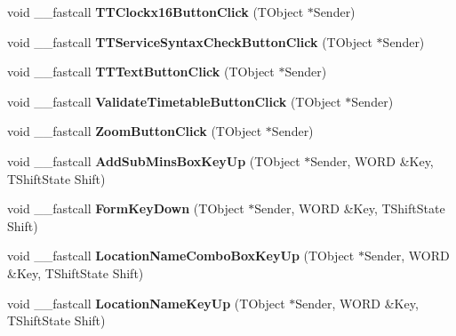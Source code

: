 \begin{DoxyCompactItemize}
\mbox{\label{class_t_interface_a4d15b0fdf4e9377ed3b528787d466be4}} 
void \+\_\+\+\_\+fastcall {\bfseries T\+T\+Clockx16\+Button\+Click} (T\+Object $\ast$Sender)
\item 
\mbox{\label{class_t_interface_a003b10236c2b4316dc57be370c715c44}} 
void \+\_\+\+\_\+fastcall {\bfseries T\+T\+Service\+Syntax\+Check\+Button\+Click} (T\+Object $\ast$Sender)
\item 
\mbox{\label{class_t_interface_a37d4b92bd992fcaee2465a0f04becbee}} 
void \+\_\+\+\_\+fastcall {\bfseries T\+T\+Text\+Button\+Click} (T\+Object $\ast$Sender)
\item 
\mbox{\label{class_t_interface_a2f501868bbee2310af99bf2e8e265c59}} 
void \+\_\+\+\_\+fastcall {\bfseries Validate\+Timetable\+Button\+Click} (T\+Object $\ast$Sender)
\item 
\mbox{\label{class_t_interface_a08305797df7dfbdd16b3e8900c33e0bc}} 
void \+\_\+\+\_\+fastcall {\bfseries Zoom\+Button\+Click} (T\+Object $\ast$Sender)
\item 
\mbox{\label{class_t_interface_a0abab134f4994b02507e1e2d3f31cd77}} 
void \+\_\+\+\_\+fastcall {\bfseries Add\+Sub\+Mins\+Box\+Key\+Up} (T\+Object $\ast$Sender, W\+O\+RD \&Key, T\+Shift\+State Shift)
\item 
\mbox{\label{class_t_interface_acc63cfe8eb8e41508e32c7f7681e7e03}} 
void \+\_\+\+\_\+fastcall {\bfseries Form\+Key\+Down} (T\+Object $\ast$Sender, W\+O\+RD \&Key, T\+Shift\+State Shift)
\item 
\mbox{\label{class_t_interface_a212c7d3a2260f69a675c7053a31cad4b}} 
void \+\_\+\+\_\+fastcall {\bfseries Location\+Name\+Combo\+Box\+Key\+Up} (T\+Object $\ast$Sender, W\+O\+RD \&Key, T\+Shift\+State Shift)
\item 
\mbox{\label{class_t_interface_ac666c9f62cdb68b29c2a7db123a43a28}} 
void \+\_\+\+\_\+fastcall {\bfseries Location\+Name\+Key\+Up} (T\+Object $\ast$Sender, W\+O\+RD \&Key, T\+Shift\+State Shift)
\item 

\end{DoxyCompactItemize}
